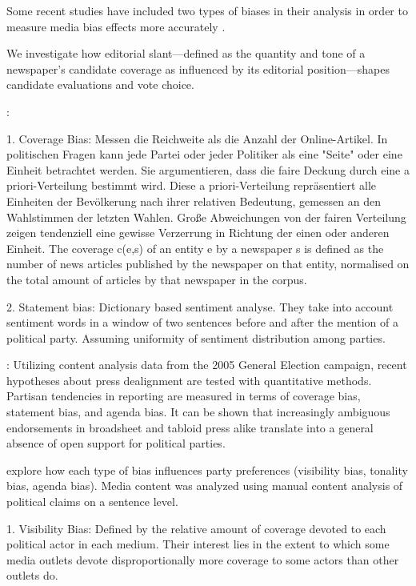 \documentclass[12pt,a4paper,notitlepage]{article}
\begin{document}

Some recent studies have included two types of biases in their analysis in order to measure media bias effects more accurately \citep{boomgaarden_reporting_2007, lengauer_candidate_2013, junque_de_fortuny_media_2012}. 

\citet{druckman_impact_2005} We investigate how editorial slant—defined as the quantity and tone of a newspaper's candidate coverage as influenced by its editorial position—shapes candidate evaluations and vote choice.

\citet{junque_de_fortuny_media_2012}:

1. Coverage Bias: Messen die Reichweite als die Anzahl der Online-Artikel. In politischen Fragen kann jede Partei oder jeder Politiker als eine "Seite" oder eine Einheit betrachtet werden. Sie argumentieren, dass die faire Deckung durch eine a priori-Verteilung bestimmt wird. Diese a priori-Verteilung repräsentiert alle Einheiten der Bevölkerung nach ihrer relativen Bedeutung, gemessen an den Wahlstimmen der letzten Wahlen. Große Abweichungen von der fairen Verteilung zeigen tendenziell eine gewisse Verzerrung in Richtung der einen oder anderen Einheit. The coverage c(e,s) of an entity e by a newspaper s is defined as the number of news articles published by the newspaper on that entity, normalised on the total amount of articles by that newspaper in the corpus.

2. Statement bias: Dictionary based sentiment analyse. They take into account sentiment words in a window of two sentences before and after the mention of a political party. Assuming uniformity of sentiment distribution among parties. 


\citet{brandenburg_party_2006}: Utilizing content analysis data from the 2005 General Election campaign, recent hypotheses about press dealignment are tested with quantitative methods. Partisan tendencies in reporting are measured in terms of coverage bias, statement bias, and agenda bias. It can be shown that increasingly ambiguous endorsements in broadsheet and tabloid press alike translate into a general absence of open support for political parties.

\citet{eberl_one_2017} explore how each type of bias influences party preferences (visibility bias, tonality bias, agenda bias). Media content was analyzed using manual content analysis of political claims on a sentence level.

1. Visibility Bias: Defined by the relative amount of coverage devoted to each political actor in each medium. Their interest lies in the extent to which some media outlets devote disproportionally more coverage to some actors than other outlets do.
\end{document}
